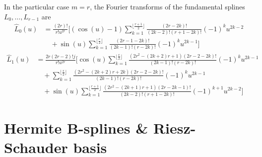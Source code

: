 \begin{con}
  In the particular case $m=r$, the Fourier transforms of the fundamental splines $L_0, \ldots, L_{r-1}$ are
  \begin{equation}
    \begin{split}
      \hat{L}_{0}(u) &= \frac{(2r)!}{r!u^{2r}} \Big[ (\cos(u)-1) \sum_{k=1}^{\lfloor \frac{r+1}{2} \rfloor} 
	\frac{(2r-2k)!}{(2k-2)!(r+1-2k)!} {(-1)}^k u^{2k-2} \\
      &\quad + \sin(u) \sum_{k=1}^{\lfloor \frac{r}{2} \rfloor} \frac{(2r-1-2k)!}{(2k-1)!(r-2k)!} {(-1)}^k u^{2k-1} 
    \Big]
    \end{split}
  \end{equation}
  \begin{equation}
    \begin{split}
      \hat{L}_1(u) &= \frac{2r(2r-2)!j}{r!u^{2r}} \Big[\cos(u) \sum_{k=1}^{\lfloor \frac{r}{2} 
	\rfloor}\frac{(2r^2-(2k+2)r+1)(2r-2-2k)!}{(2k-1)!(r-2k)!} {(-1)}^k u^{2k-1} \\
      &\quad + \sum_{k=1}^{\lfloor \frac{r}{2} \rfloor}\frac{(2r^2-(2k+2)r+2k)(2r-2-2k)!}{(2k-1)!(r-2k)!} {(-1)}^k 
    u^{2k-1} \\
      &\quad + \sin(u) \sum_{k=1}^{\lfloor \frac{r+1}{2} \rfloor} \frac{(2r^2-(2k+1)r+1)(2r-2k-1)!}{(2k-2)!(r+1-2k)!} 
    {(-1)}^{k+1} u^{2k-2} \Big]
    \end{split}
  \end{equation}
\end{con}

\section{Hermite B-splines \& Riesz-Schauder basis}


